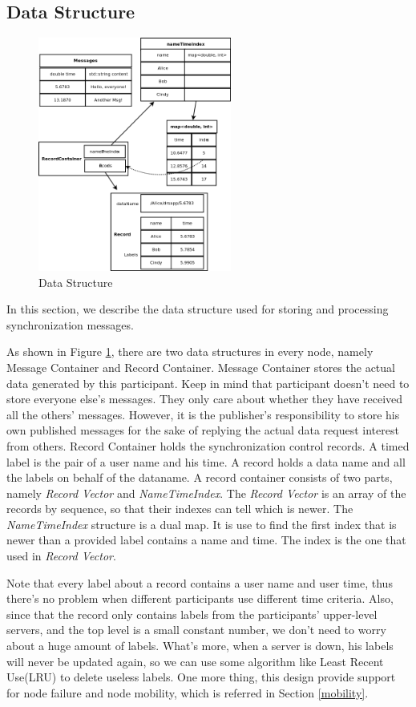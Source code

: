 \documentclass[conference]{IEEEtran}
\begin{document}
\subsection{Data Structure}
\begin{figure}[!t]
\centering
\includegraphics[width=2.5in]{../png/data-structure.png}
\caption{Data Structure}
\label{data_structure}
\end{figure}
In this section, we describe the data structure used for storing and processing synchronization messages.

As shown in Figure \ref{data_structure}, there are two data structures in every node, namely Message Container and Record Container.
Message Container stores the actual data generated by this participant. Keep in mind that participant doesn't need to store everyone else's messages. They only care about whether they have received all the others' messages. However, it is the publisher's responsibility to store his own published messages for the sake of replying the actual data request interest from others.
Record Container holds the synchronization control records. A timed label is the pair of a user name and his time. A record holds a data name and all the labels on behalf of the dataname. A record container consists of two parts, namely \emph{Record Vector} and \emph{NameTimeIndex}. The \emph{Record Vector} is an array of the records by sequence, so that their indexes can tell which is newer. The \emph{NameTimeIndex} structure is a dual map. It is use to find the first index that is newer than a provided label contains a name and time. The index is the one that used in \emph{Record Vector}.

Note that every label about a record contains a user name and user time, thus there's no problem when different participants use different time criteria. Also, since that the record only contains labels from the participants' upper-level servers, and the top level is a small constant number, we don't need to worry about a huge amount of labels. What's more, when a server is down, his labels will never be updated again, so we can use some algorithm like Least Recent Use(LRU)\cite{LRU} to delete useless labels. One more thing, this design provide support for node failure and node mobility, which is referred in Section \ref{mobility}.
\end{document}
